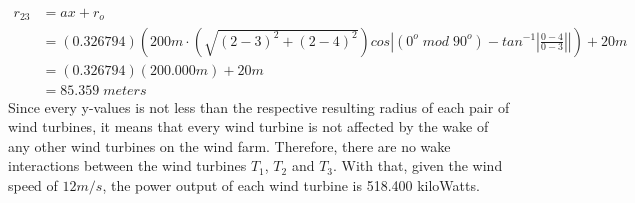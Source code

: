     \begin{align*}
        r_{23}
        &= ax+r_o \\
        &= (0.326794)\left( 200m\cdot \left( \sqrt{(2-3)^2+(2-4)^2} \right)cos \left| (0^o\;mod\;90^o) - tan^{-1}\left|\frac{0-4}{0-3}\right| \right| \right) + 20m \\
        &=(0.326794)(200.000m)+20m \\
        &= 85.359\;meters
    \end{align*}
    Since every y-values is not less than the respective resulting radius of each pair of wind turbines, it means that every wind turbine is not affected by the wake of any other wind turbines on the wind farm. Therefore, there are no wake interactions between the wind turbines $T_1$, $T_2$ and $T_3$. With that, given the wind speed of $12m/s$, the power output of each wind turbine is 518.400 kiloWatts.
    
